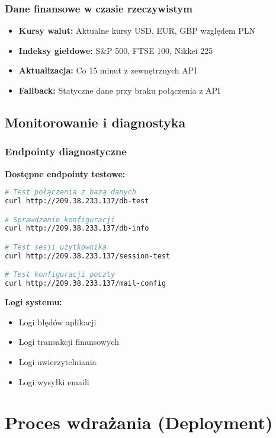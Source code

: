 \documentclass[12pt,a4paper]{article}
\begin{document}
    \subsubsection{Dane finansowe w czasie rzeczywistym}

    \begin{itemize}
        \item \textbf{Kursy walut:} Aktualne kursy USD, EUR, GBP względem PLN
        \item \textbf{Indeksy giełdowe:} S\&P 500, FTSE 100, Nikkei 225
        \item \textbf{Aktualizacja:} Co 15 minut z zewnętrznych API
        \item \textbf{Fallback:} Statyczne dane przy braku połączenia z API
    \end{itemize}

    \subsection{Monitorowanie i diagnostyka}

    \subsubsection{Endpointy diagnostyczne}

    \textbf{Dostępne endpointy testowe:}
    \begin{lstlisting}[language=bash, caption=Testowanie endpointów zdalnych]
# Test połączenia z bazą danych
curl http://209.38.233.137/db-test

# Sprawdzenie konfiguracji
curl http://209.38.233.137/db-info

# Test sesji użytkownika
curl http://209.38.233.137/session-test

# Test konfiguracji poczty
curl http://209.38.233.137/mail-config
    \end{lstlisting}

    \textbf{Logi systemu:}
    \begin{itemize}
        \item Logi błędów aplikacji
        \item Logi transakcji finansowych
        \item Logi uwierzytelniania
        \item Logi wysyłki emaili
    \end{itemize}

    \section{Proces wdrażania (Deployment)}
\end{document}
